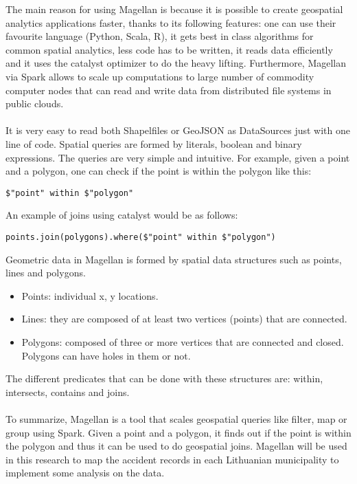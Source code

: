 The main reason for using Magellan is because it is possible to create geospatial analytics applications faster, thanks to its following features: one can use their favourite language (Python, Scala, R), it gets best in class algorithms for common spatial analytics, less code has to be written, it reads data efficiently and it uses the catalyst optimizer to do the heavy lifting. Furthermore, Magellan via Spark allows to scale up computations to large number of commodity computer nodes that can read and write data from distributed file systems in public clouds.
\\
\\
It is very easy to read both Shapelfiles or GeoJSON as DataSources just with one line of code. Spatial queries are formed by literals, boolean and binary expressions. The queries are very simple and intuitive. For example, given a point and a polygon, one can check if the point is within the polygon like this: 
\begin{lstlisting}[style=myScalastyle]
$"point" within $"polygon"
\end{lstlisting}

An example of joins using catalyst would be as follows: 
\begin{lstlisting}[style=myScalastyle]
points.join(polygons).where($"point" within $"polygon")
\end{lstlisting}

Geometric data in Magellan is formed by spatial data structures such as points, lines and polygons.
\begin{itemize}
    \item Points: individual x, y locations.
    \item Lines: they are composed of at least two vertices (points) that are connected.
    \item Polygons: composed of three or more vertices that are connected and closed. Polygons can have holes in them or not. 
\end{itemize}
The different predicates that can be done with these structures are: within, intersects, contains and joins.
\\
\\
To summarize, Magellan is a tool that scales geospatial queries like filter, map or group using Spark. Given a point and a polygon, it finds out if the point is within the polygon and thus it can be used to do geospatial joins. Magellan will be used in this research to map the accident records in each Lithuanian municipality to implement some analysis on the data. 


